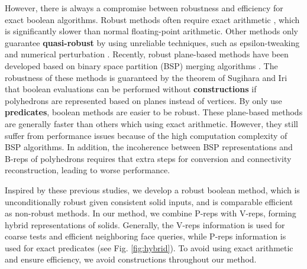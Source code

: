However, there is always a compromise between robustness and efficiency for exact boolean algorithms.
Robust methods often require exact arithmetic \cite{barki2015exact,zhou2016mesh}, which is significantly slower than normal floating-point arithmetic.
Other methods only guarantee \textbf{quasi-robust} \cite{shewchuk1999lecture} by using unreliable techniques, such as epsilon-tweaking \cite{laidlaw1986constructive,feito2013fast,segal1990using} and numerical perturbation \cite{douze2015quickcsg}.
Recently, robust plane-based methods have been developed \cite{bernstein2009fast,campen2010exact} based on binary space partition (BSP) merging algorithms \cite{naylor1990merging,thibault1987set}.
The robustness of these methods is guaranteed by the theorem of Sugihara and Iri \cite{sugihara1990solid} that boolean evaluations can be performed without \textbf{constructions} \cite{shewchuk1999lecture} if polyhedrons are represented based on planes instead of vertices.
By only use \textbf{predicates}, boolean methods are easier to be robust.
These plane-based methods are generally faster than others which using exact arithmetic. However, they still suffer from performance issues because of the high computation complexity of BSP algorithms. In addition, the incoherence between BSP representations and B-reps of polyhedrons requires that extra steps for conversion and connectivity reconstruction, leading to worse performance.


Inspired by these previous studies, we develop a robust boolean method, which is unconditionally robust given consistent solid inputs, and is comparable efficient as non-robust methods. In our method, we combine P-reps with V-reps, forming hybrid representations of solids. Generally, the V-reps information is used for coarse tests and efficient neighboring face queries, while P-reps information is used for exact predicates (see Fig. \ref{fig:hybrid}). To avoid using exact arithmetic and ensure efficiency, we avoid constructions throughout our method.


